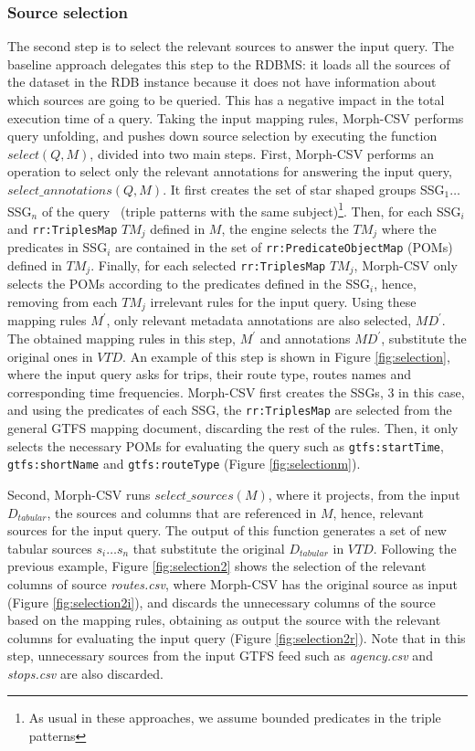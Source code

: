 \subsubsection*{Source selection}
The second step is to select the relevant sources to answer the input query. The baseline approach delegates this step to the RDBMS: it loads all the sources of the dataset in the RDB instance because it does not have information about which sources are going to be queried. This has a negative impact in the total execution time of a query. Taking the input mapping rules, Morph-CSV performs query unfolding, and pushes down source selection by executing the function $select(Q,M)$, divided into two main steps. First, Morph-CSV performs an operation to select only the relevant annotations for answering the input query, $select\_annotations(Q,M)$. It first creates the set of star shaped groups SSG$_1\ldots $SSG$_n$ of the query~\citep{vidal2010efficient} (triple patterns with the same subject)\footnote{As usual in these approaches, we assume bounded predicates in the triple patterns}. Then, for each SSG$_i$ and \texttt{rr:TriplesMap} $TM_j$ defined in $M$, the engine selects the $TM_j$ where the predicates in SSG$_i$ are contained in the set of \texttt{rr:PredicateObjectMap} (POMs) defined in $TM_j$. Finally, for each selected \texttt{rr:TriplesMap} $TM_j$, Morph-CSV only selects the POMs according to the predicates defined in the SSG$_i$, hence, removing from each $TM_j$ irrelevant rules for the input query. Using these mapping rules $M^{'}$, only relevant metadata annotations are also selected, $MD^{'}$. The obtained mapping rules in this step, $M^{'}$ and annotations $MD^{'}$, substitute the original ones in $VTD$. An example of this step is shown in Figure \ref{fig:selection}, where the input query asks for trips, their route type, routes names and corresponding time frequencies. Morph-CSV first creates the SSGs, 3 in this case, and using the predicates of each SSG, the \texttt{rr:TriplesMap} are selected from the general GTFS mapping document, discarding the rest of the rules. Then, it only selects the necessary POMs for evaluating the query such as \texttt{gtfs:startTime}, \texttt{gtfs:shortName} and \texttt{gtfs:routeType} (Figure \ref{fig:selectionm}).

Second, Morph-CSV runs $select\_sources(M)$, where it projects, from the input $D_{tabular}$, the sources and columns that are referenced in $M$, hence, relevant sources for the input query. The output of this function generates a set of new tabular sources $s_i\ldots s_n$ that substitute the original $D_{tabular}$ in $VTD$. Following the previous example, Figure \ref{fig:selection2} shows the selection of the relevant columns of  source \textit{routes.csv}, where Morph-CSV has the original source as  input (Figure \ref{fig:selection2i}), and discards the unnecessary columns of the source based on the mapping rules, obtaining as output the source with the relevant columns for evaluating the input query (Figure \ref{fig:selection2r}). Note that in this step, unnecessary sources from the input GTFS feed such as \textit{agency.csv} and \textit{stops.csv} are also discarded.

